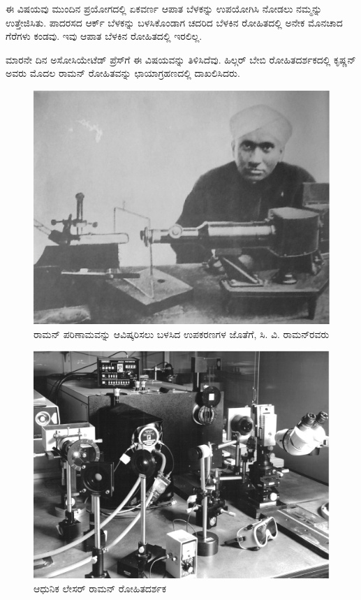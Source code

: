 ಈ ವಿಷಯವು ಮುಂದಿನ ಪ್ರಯೋಗದಲ್ಲಿ ಏಕವರ್ಣ ಆಪಾತ ಬೆಳಕನ್ನು ಉಪಯೋಗಿಸಿ ನೋಡಲು ನಮ್ಮನ್ನು ಉತ್ತೇಜಿಸಿತು. ಪಾದರಸದ ಆರ್ಕ್ ಬೆಳಕನ್ನು ಬಳಸಿಕೊಂಡಾಗ ಚದರಿದ ಬೆಳಕಿನ ರೋಹಿತದಲ್ಲಿ ಅನೇಕ ಮೊನಚಾದ ಗೆರೆಗಳು ಕಂಡವು. ಇವು ಆಪಾತ ಬೆಳಕಿನ ರೋಹಿತದಲ್ಲಿ ಇರಲಿಲ್ಲ.

ಮಾರನೇ ದಿನ ಅಸೋಸಿಯೇಟೆಡ್ ಪ್ರೆಸ್‍ಗೆ ಈ ವಿಷಯವನ್ನು ತಿಳಿಸಿದೆವು. ಹಿಲ್ಗರ್ ಬೇಬಿ ರೋಹಿತದರ್ಶಕದಲ್ಲಿ ಕೃಷ್ಣನ್ ಅವರು ಮೊದಲ ರಾಮನ್ ರೋಹಿತವನ್ನು ಛಾಯಾಗ್ರಹಣದಲ್ಲಿ ದಾಖಲಿಸಿದರು.

\begin{figure}[!htbp]
\includegraphics[scale=0.83]{"images/1.jpg"}
\caption{ರಾಮನ್ ಪರಿಣಾಮವನ್ನು ಆವಿಷ್ಕರಿಸಲು ಬಳಸಿದ ಉಪಕರಣಗಳ ಜೊತೆಗೆ, ಸಿ. ವಿ. ರಾಮನ್‍ರವರು}\label{chap1-fig01}
\end{figure}


\begin{figure}[!htbp]
\includegraphics[scale=0.2]{"images/2.jpg"}
\caption{ಆಧುನಿಕ ಲೇಸರ್ ರಾಮನ್ ರೋಹಿತದರ್ಶಕ}
\end{figure}


